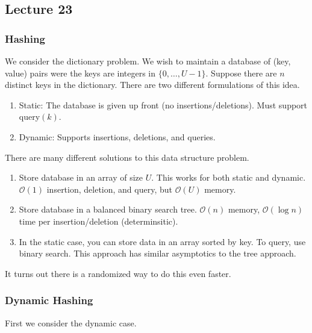 \subsection{Lecture 23}
\subsubsection{Hashing}

We consider the dictionary problem. We wish to maintain a database of (key, value) pairs were the keys are integers in $\{0, \dots, U - 1\}$.
Suppose there are $n$ distinct keys in the dictionary.
There are two different formulations of this idea.

\begin{enumerate}
    \item Static: The database is given up front (no insertions/deletions). Must support query$(k)$.
    \item Dynamic: Supports insertions, deletions, and queries.
\end{enumerate}

There are many different solutions to this data structure problem.

\begin{enumerate}
    \item Store database in an array of size $U$. This works for both static and dynamic. $\mathcal{O}(1)$ insertion, deletion, and query, but $\mathcal{O}(U)$ memory.
    \item Store database in a balanced binary search tree. $\mathcal{O}(n)$ memory, $\mathcal{O}(\log n)$ time per insertion/deletion (determinsitic).
    \item In the static case, you can store data in an array sorted by key. To query, use binary search. This approach has similar asymptotics to the tree approach.
\end{enumerate}

It turns out there is a randomized way to do this even faster.

\subsubsection{Dynamic Hashing}
First we consider the dynamic case.

